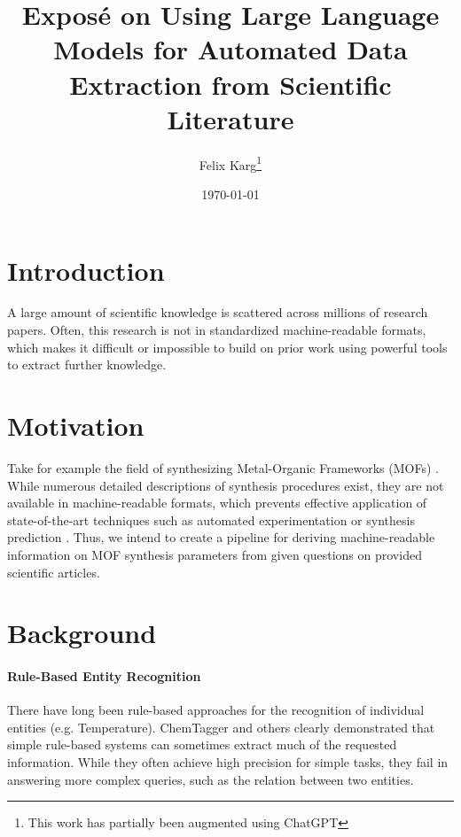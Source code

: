 \documentclass[a4paper,11pt]{article}
\title{Exposé on Using Large Language Models for Automated Data Extraction from Scientific Literature}
\author{Felix Karg\footnote{This work has partially been augmented using ChatGPT}}
\date{\today}
\newcommand{\margtodo}                                 %
{\marginpar{\textbf{\textcolor{red}{ToDo}}}{}}
\newcommand{\todo}[1]
{{\textbf{\textcolor{red}{[\margtodo{}#1]}}}{}}   %
\begin{document}
\maketitle




\section{Introduction}
A large amount of scientific knowledge is scattered across millions of research
papers. Often, this research is not in standardized machine-readable formats,
which makes it difficult or impossible to build on prior work using powerful
tools to extract further knowledge.  %

\section{Motivation}
Take for example the field of synthesizing Metal-Organic Frameworks (MOFs)
\cite{zhou_introduction_2012}. While numerous detailed descriptions of
synthesis procedures exist, they are not available in machine-readable formats,
which prevents effective application of state-of-the-art techniques such as
automated experimentation \cite{shi_automated_2021} or synthesis prediction
\cite{luo_mof_2022}. Thus, we intend to create a pipeline for deriving
machine-readable information on MOF synthesis parameters from given questions
on provided scientific articles.


\section{Background}
\paragraph{Rule-Based Entity Recognition}
There have long been rule-based approaches for the recognition of individual
entities (e.g. Temperature). ChemTagger \cite{hawizy_chemicaltagger_2011}
and others \cite{beard_comparative_2019, huang_database_2020}
clearly demonstrated that simple rule-based systems can sometimes extract much
of the requested information. While they often achieve high precision for
simple tasks, they fail in answering more complex queries, such as the relation
between two entities.
\end{document}
